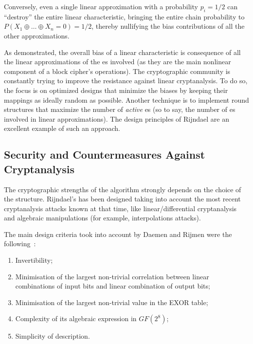             Conversely, even a single linear approximation with a probability $p_i = 1/2$ can ``destroy'' the entire linear characteristic, bringing the entire chain probability to $P(X_1 \oplus \dots \oplus X_n = 0) = 1/2$, thereby nullifying the bias contributions of all the other approximations. 

            As demonstrated, the overall bias of a linear characteristic is consequence of all the linear approximations of the \sbocs{}es involved (as they are the main nonlinear component of a block cipher's operations). The cryptographic community is constantly trying to improve the resistance against linear cryptanalysis. To do so, the focus is on optimized \sbocs{} designs that minimize the biases by keeping their mappings as ideally random as possible. Another technique is to implement round structures that maximize the number of \emph{active} \sbocs{}es (so to say, the number of \sbocs{}es involved in linear approximations). The design principles of Rijndael are an excellent example of such an approach.

    \subsection{\aes{} Security and Countermeasures Against Cryptanalysis}\label{subsec:aes_security}
        The cryptographic strengths of the \aes{} algorithm strongly depends on the choice of the \sbocs{} structure. Rijndael's \sbocs{} has been designed taking into account the most recent cryptanalysis attacks known at that time, like linear/differential cryptanalysis and algebraic manipulations (for example, interpolations attacks).

        \noindent The main design criteria took into account by Daemen and Rijmen were the following~\cite{daemen1999aes}:

        \begin{enumerate}
            \item Invertibility;
            \item Minimisation of the largest non-trivial correlation between linear combinations of input bits and linear combination of output bits;
            \item Minimisation of the largest non-trivial value in the EXOR table;
            \item Complexity of its algebraic expression in $GF(2^8)$;
            \item Simplicity of description.
        \end{enumerate}

